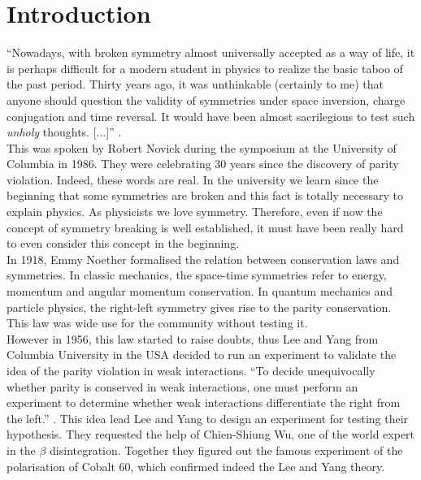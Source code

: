 \documentclass[10pt,swedish, openany]{book}
\begin{document}
\clearpage


\mainmatter

\chapter{Introduction}

``Nowadays, with broken symmetry almost universally accepted as a way of life, it is perhaps difficult for a modern student in physics to realize the basic taboo of the past period. Thirty years ago, it was unthinkable (certainly to me) that anyone should question the validity of symmetries under space inversion, charge conjugation and time reversal. It would have been almost sacrilegious to test such \emph{unholy} thoughts. [...]'' \cite{violation}. \\

This was spoken by Robert Novick during the symposium at the University of Columbia in 1986. They were celebrating 30 years since the discovery of parity violation. Indeed, these words are real. In the university we learn since the beginning that some symmetries are broken and this fact is totally necessary to explain physics. As physicists we love symmetry. Therefore, even if now the concept of symmetry breaking is well established, it must have been really hard to even consider this concept in the beginning.\\

In 1918, Emmy Noether formalised the relation between conservation laws and symmetries. In classic mechanics, the space-time symmetries refer to energy, momentum and angular momentum conservation. In quantum mechanics and particle physics, the right-left symmetry gives rise to the parity conservation. This law was wide use for the community without testing it.\\

However in 1956, this law started to raise doubts, thus Lee and Yang from Columbia University in the USA decided to run an experiment to validate the idea of the parity violation in weak interactions. ``To decide unequivocally whether parity is conserved in weak interactions, one must perform an experiment to determine whether weak interactions differentiate the right from the left.'' \cite{parity}. This idea lead Lee and Yang to design an experiment for testing their hypothesis. They requested the help of Chien-Shiung Wu, one of the world expert in the $\beta$ disintegration. Together they figured out the famous experiment of the polarisation of Cobalt 60, which confirmed indeed the Lee and Yang theory.\\
\end{document}
